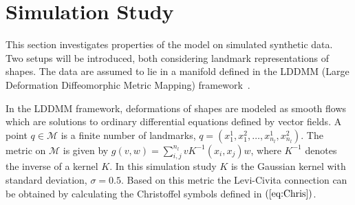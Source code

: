 \documentclass[runningheads,a4paper]{llncs}
\newcommand{\M}{\mathcal{M}}
\begin{document}

%

\section{Simulation Study}
\label{sec:sim}

This section investigates properties of the model on simulated synthetic data. Two setups will be introduced, both considering landmark representations of shapes. The data are assumed to lie in a manifold defined in the LDDMM (Large Deformation Diffeomorphic Metric Mapping) framework~\cite{shapes}.

 In the LDDMM framework, deformations of shapes are modeled as smooth flows which are solutions to ordinary differential equations defined by vector fields. A point $q\in\M$ is a finite number of landmarks, $q = (x_1^1,x_1^2,\ldots,x_{n_l}^1,x_{n_l}^2)$. The metric on $\M$ is given by $g(v,w) = \sum_{i,j}^{n_l} vK^{-1}(x_i,x_j)w$, where $K^{-1}$ denotes the inverse of a kernel $K$. In this simulation study $K$ is the Gaussian kernel with standard deviation, $\sigma = 0.5$. Based on this metric the Levi-Civita connection can be obtained by calculating the Christoffel symbols defined in $(\ref{eq:Chris})$.
\end{document}
